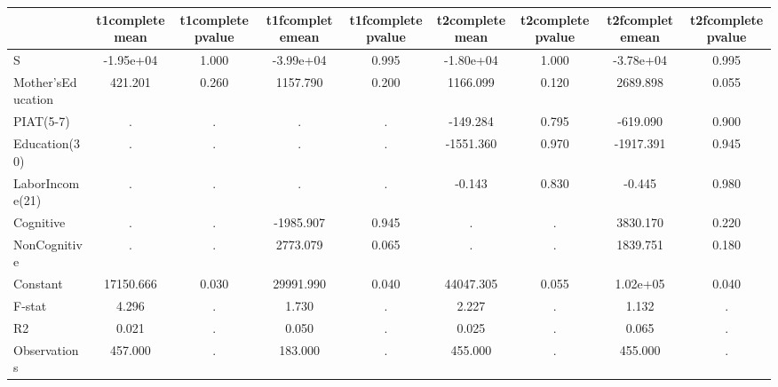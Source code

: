 \begin{table}[htbp]
\begin{tabular}{lcccccccc} \hline \hline
 & t1completemean  & t1completepvalue  & t1fcompletemean  & t1fcompletepvalue  & t2completemean  & t2completepvalue  & t2fcompletemean  & t2fcompletepvalue  \\  \hline 
S & -1.95e+04 &     1.000 & -3.99e+04 &     0.995 & -1.80e+04 &     1.000 & -3.78e+04 &     0.995 \\  
Mother'sEducation &   421.201 &     0.260 &  1157.790 &     0.200 &  1166.099 &     0.120 &  2689.898 &     0.055 \\  
PIAT(5-7) &         . &         . &         . &         . &  -149.284 &     0.795 &  -619.090 &     0.900 \\  
Education(30) &         . &         . &         . &         . & -1551.360 &     0.970 & -1917.391 &     0.945 \\  
LaborIncome(21) &         . &         . &         . &         . &    -0.143 &     0.830 &    -0.445 &     0.980 \\  
Cognitive &         . &         . & -1985.907 &     0.945 &         . &         . &  3830.170 &     0.220 \\  
NonCognitive &         . &         . &  2773.079 &     0.065 &         . &         . &  1839.751 &     0.180 \\  
Constant & 17150.666 &     0.030 & 29991.990 &     0.040 & 44047.305 &     0.055 &  1.02e+05 &     0.040 \\  
F-stat &     4.296 &         . &     1.730 &         . &     2.227 &         . &     1.132 &         . \\  
R2 &     0.021 &         . &     0.050 &         . &     0.025 &         . &     0.065 &         . \\  
Observations &   457.000 &         . &   183.000 &         . &   455.000 &         . &   455.000 &         . \\  
\hline \hline \end{tabular}
\end{table}
